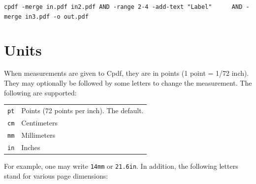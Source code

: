 \documentclass{book}
\begin{document}
\begin{framed}
  \noindent\small\verb!cpdf -merge in.pdf in2.pdf AND -range 2-4 -add-text "Label"!
  \noindent\small\verb!     AND -merge in3.pdf -o out.pdf!
\end{framed}

\section{Units}
When measurements are given to Cpdf, they are in points (1 point = 1/72 inch). They may optionally
be followed by some letters to change the measurement. The following are
supported:

\begin{center}
\begin{tabular}{rl}
  \texttt{pt} & Points (72 points per inch). The default. \\
  \texttt{cm} & Centimeters \\
  \texttt{mm} & Millimeters \\
  \texttt{in} & Inches \\
\end{tabular}
\end{center}

\noindent For example, one may write \texttt{14mm} or \texttt{21.6in}. In addition, the following letters stand for various page dimensions:
\end{document}
